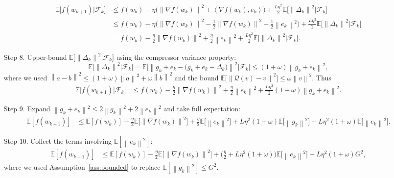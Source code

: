 \documentclass{article}
\newcommand{\E}{\mathbb{E}}
\newcommand{\norm}[1]{\left\|#1\right\|}
\newcommand{\inner}[2]{\left\langle #1,#2\right\rangle}
\newcommand{\Q}{\mathcal{Q}}
\begin{document}
\begin{enumerate}
\begin{align}
\E\!\big[f(w_{k+1})\big|\mathcal{F}_k\big]
&\le f(w_k)-\eta\Big(\norm{\nabla f(w_k)}^{2}
                     +\inner{\nabla f(w_k)}{e_k}\Big)
   +\frac{L\eta^{2}}{2}\E\!\big[\norm{\Delta_k}^{2}\big|\mathcal{F}_k\big] \nonumber\\
&\le f(w_k)-\eta\Big(\norm{\nabla f(w_k)}^{2}
                     -\tfrac{1}{2}\norm{\nabla f(w_k)}^{2}
                     -\tfrac{1}{2}\norm{e_k}^{2}\Big)
   +\frac{L\eta^{2}}{2}\E\!\big[\norm{\Delta_k}^{2}\big|\mathcal{F}_k\big] \nonumber\\
&= f(w_k)-\frac{\eta}{2}\norm{\nabla f(w_k)}^{2}
        +\frac{\eta}{2}\norm{e_k}^{2}
        +\frac{L\eta^{2}}{2}\E\!\big[\norm{\Delta_k}^{2}\big|\mathcal{F}_k\big].
\label{eq:mid}
\end{align}
\item[Step 8.] Upper‑bound $\E\!\big[\norm{\Delta_k}^{2}\big|\mathcal{F}_k\big]$ using the compressor variance property:
\[
\E\!\big[\norm{\Delta_k}^{2}\big|\mathcal{F}_k\big]
= \E\!\big[\norm{g_k+e_k-\big(g_k+e_k-\Delta_k\big)}^{2}\big|\mathcal{F}_k\big]
\le (1+\omega)\norm{g_k+e_k}^{2},
\]
where we used $\norm{a-b}^{2}\le (1+\omega)\norm{a}^{2}+\omega\norm{b}^{2}$ and the bound $\E\!\big[\norm{\Q(v)-v}^{2}\big]\le\omega\norm{v}^{2}$.
Thus
\begin{align}
\E\!\big[f(w_{k+1})\big|\mathcal{F}_k\big]
&\le f(w_k)-\frac{\eta}{2}\norm{\nabla f(w_k)}^{2}
   +\frac{\eta}{2}\norm{e_k}^{2}
   +\frac{L\eta^{2}}{2}(1+\omega)\norm{g_k+e_k}^{2}. \label{eq:bound1}
\end{align}
\item[Step 9.] Expand $\norm{g_k+e_k}^{2}\le 2\norm{g_k}^{2}+2\norm{e_k}^{2}$ and take full expectation:
\begin{align}
\E[f(w_{k+1})]
&\le \E[f(w_k)]-\frac{\eta}{2}\E\!\big[\norm{\nabla f(w_k)}^{2}\big]
   +\frac{\eta}{2}\E\!\big[\norm{e_k}^{2}\big]
   +L\eta^{2}(1+\omega)\E\!\big[\norm{g_k}^{2}\big]
   +L\eta^{2}(1+\omega)\E\!\big[\norm{e_k}^{2}\big]. \label{eq:bound2}
\end{align}
\item[Step 10.] Collect the terms involving $\E[\norm{e_k}^{2}]$:
\begin{align}
\E[f(w_{k+1})]
&\le \E[f(w_k)]-\frac{\eta}{2}\E\!\big[\norm{\nabla f(w_k)}^{2}\big]
   +\Big(\tfrac{\eta}{2}+L\eta^{2}(1+\omega)\Big)\E\!\big[\norm{e_k}^{2}\big]
   +L\eta^{2}(1+\omega)G^{2},
\end{align}
where we used Assumption~\ref{ass:bounded} to replace $\E[\norm{g_k}^{2}]\le G^{2}$.


\end{enumerate}
\end{document}
